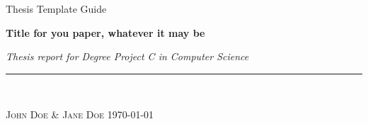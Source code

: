 
\vspace*{5cm}

{\huge \textsf{Thesis Template Guide}}

\begin{flushleft}
  
\Huge \textsf{\textbf{Title for you paper, whatever it may be}}
\end{flushleft}

\emph{\large Thesis report for Degree Project C in Computer Science} \hfill \\
\rule{\textwidth}{1pt} \\
\begin{flushright}
\textsc{John Doe \& Jane Doe} \quad \today
%
\end{flushright}


\thispagestyle{empty}
